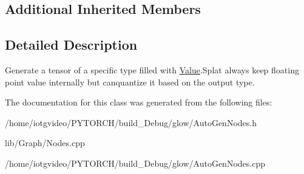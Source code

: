 \subsection*{Additional Inherited Members}


\subsection{Detailed Description}
Generate a tensor of a specific type filled with \textquotesingle{}\hyperlink{classglow_1_1_value}{Value}\textquotesingle{}.Splat always keep floating point value internally but canquantize it based on the output type. 

The documentation for this class was generated from the following files\+:\begin{DoxyCompactItemize}
\item 
/home/iotgvideo/\+P\+Y\+T\+O\+R\+C\+H/build\+\_\+\+Debug/glow/Auto\+Gen\+Nodes.\+h\item 
lib/\+Graph/Nodes.\+cpp\item 
/home/iotgvideo/\+P\+Y\+T\+O\+R\+C\+H/build\+\_\+\+Debug/glow/Auto\+Gen\+Nodes.\+cpp\end{DoxyCompactItemize}
